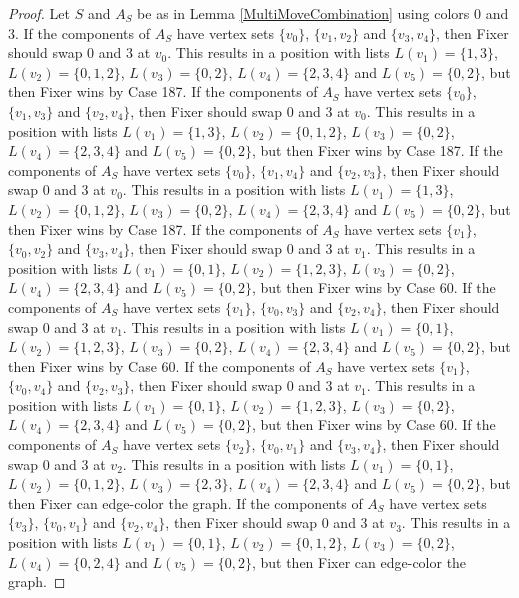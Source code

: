 \documentclass[12pt]{amsart}
\theoremstyle{plain}
\theoremstyle{definition}
\theoremstyle{remark}
\begin{document}
\begin{proof}
Let $S$ and $A_S$ be as in Lemma \ref{MultiMoveCombination} using colors $0$ and $3$. If the components of $A_S$ have vertex sets $\{v_0\}$, $\{v_1, v_2\}$ and $\{v_3, v_4\}$, then Fixer should swap 0 and 3 at $v_0$. This results in a position with lists $L(v_1) = \{1, 3\}$, $L(v_2) = \{0, 1, 2\}$, $L(v_3) = \{0, 2\}$, $L(v_4) = \{2, 3, 4\}$ and $L(v_5) = \{0, 2\}$, but then Fixer wins by Case 187.
If the components of $A_S$ have vertex sets $\{v_0\}$, $\{v_1, v_3\}$ and $\{v_2, v_4\}$, then Fixer should swap 0 and 3 at $v_0$. This results in a position with lists $L(v_1) = \{1, 3\}$, $L(v_2) = \{0, 1, 2\}$, $L(v_3) = \{0, 2\}$, $L(v_4) = \{2, 3, 4\}$ and $L(v_5) = \{0, 2\}$, but then Fixer wins by Case 187.
If the components of $A_S$ have vertex sets $\{v_0\}$, $\{v_1, v_4\}$ and $\{v_2, v_3\}$, then Fixer should swap 0 and 3 at $v_0$. This results in a position with lists $L(v_1) = \{1, 3\}$, $L(v_2) = \{0, 1, 2\}$, $L(v_3) = \{0, 2\}$, $L(v_4) = \{2, 3, 4\}$ and $L(v_5) = \{0, 2\}$, but then Fixer wins by Case 187.
If the components of $A_S$ have vertex sets $\{v_1\}$, $\{v_0, v_2\}$ and $\{v_3, v_4\}$, then Fixer should swap 0 and 3 at $v_1$. This results in a position with lists $L(v_1) = \{0, 1\}$, $L(v_2) = \{1, 2, 3\}$, $L(v_3) = \{0, 2\}$, $L(v_4) = \{2, 3, 4\}$ and $L(v_5) = \{0, 2\}$, but then Fixer wins by Case 60.
If the components of $A_S$ have vertex sets $\{v_1\}$, $\{v_0, v_3\}$ and $\{v_2, v_4\}$, then Fixer should swap 0 and 3 at $v_1$. This results in a position with lists $L(v_1) = \{0, 1\}$, $L(v_2) = \{1, 2, 3\}$, $L(v_3) = \{0, 2\}$, $L(v_4) = \{2, 3, 4\}$ and $L(v_5) = \{0, 2\}$, but then Fixer wins by Case 60.
If the components of $A_S$ have vertex sets $\{v_1\}$, $\{v_0, v_4\}$ and $\{v_2, v_3\}$, then Fixer should swap 0 and 3 at $v_1$. This results in a position with lists $L(v_1) = \{0, 1\}$, $L(v_2) = \{1, 2, 3\}$, $L(v_3) = \{0, 2\}$, $L(v_4) = \{2, 3, 4\}$ and $L(v_5) = \{0, 2\}$, but then Fixer wins by Case 60.
If the components of $A_S$ have vertex sets $\{v_2\}$, $\{v_0, v_1\}$ and $\{v_3, v_4\}$, then Fixer should swap 0 and 3 at $v_2$. This results in a position with lists $L(v_1) = \{0, 1\}$, $L(v_2) = \{0, 1, 2\}$, $L(v_3) = \{2, 3\}$, $L(v_4) = \{2, 3, 4\}$ and $L(v_5) = \{0, 2\}$, but then Fixer can edge-color the graph.
If the components of $A_S$ have vertex sets $\{v_3\}$, $\{v_0, v_1\}$ and $\{v_2, v_4\}$, then Fixer should swap 0 and 3 at $v_3$. This results in a position with lists $L(v_1) = \{0, 1\}$, $L(v_2) = \{0, 1, 2\}$, $L(v_3) = \{0, 2\}$, $L(v_4) = \{0, 2, 4\}$ and $L(v_5) = \{0, 2\}$, but then Fixer can edge-color the graph.

\end{proof}
\end{document}
